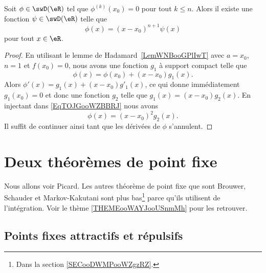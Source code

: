 \begin{corollary}       \label{CorQBXHooZVKeNG}
	Soit \( \phi\in\swD(\eR)\) tel que \( \phi^{(k)}(x_0)=0\) pour tout \( k\leq n\). Alors il existe une fonction \( \psi\in\swD(\eR)\) telle que
	\begin{equation}
		\phi(x)=(x-x_0)^{n+1}\psi(x)
	\end{equation}
	pour tout \( x\in \eR\).
\end{corollary}

\begin{proof}
	En utilisant le lemme de Hadamard~\ref{LemWNBooGPlIwT} avec \( a=x_0\), \( n=1\) et \( f(x_0)=0\), nous avons une fonction \( g_1\) à support compact telle que
	\begin{equation}        \label{EqTOJGooWZBBRJ}
		\phi(x)=\phi(x_0)+(x-x_0)g_1(x).
	\end{equation}
	Alors \( \phi'(x)=g_1(x)+(x-x_0)g'_1(x)\), ce qui donne immédiatement \( g_1(x_0)=0\) et donc une fonction \( g_2\) telle que \( g_1(x)=(x-x_0)g_2(x)\). En injectant dans \eqref{EqTOJGooWZBBRJ} nous avons
	\begin{equation}
		\phi(x)=(x-x_0)^2g_2(x).
	\end{equation}
	Il suffit de continuer ainsi tant que les dérivées de \( \phi\) s'annulent.
\end{proof}

\section{Deux théorèmes de point fixe}

Nous allons voir Picard. Les autres théorème de point fixe que sont Brouwer, Schauder et Markov-Kakutani sont plus bas\footnote{Dans la section \ref{SECooDWMPooWZgzRZ}.} parce qu'ils utilisent de l'intégration. Voir le thème \ref{THEMEooWAYJooUSnmMh} pour les retrouver.

\subsection{Points fixes attractifs et répulsifs}

